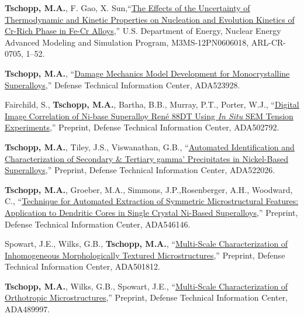 \begin{cvlist}
\item 
\textbf{Tschopp, M.A.}, F. Gao, X. Sun,``\href{https://apps.dtic.mil/dtic/tr/fulltext/u2/1043117.pdf}{The Effects of the Uncertainty of Thermodynamic and Kinetic Properties on Nucleation and Evolution Kinetics of Cr-Rich Phase in Fe-Cr Alloys},'' U.S. Department of Energy, Nuclear Energy Advanced Modeling and Simulation Program, M3MS-12PN0606018, ARL-CR-0705, 1--52.

\item 
\textbf{Tschopp, M.A.}, ``\href{http://www.dtic.mil/docs/citations/ADA523928}{Damage Mechanics Model Development for Monocrystalline Superalloys},'' Defense Technical Information Center, ADA523928.

\item 
Fairchild, S., \textbf{Tschopp, M.A.}, Bartha, B.B., Murray, P.T., Porter, W.J., ``\href{http://www.dtic.mil/docs/citations/ADA502792}{Digital Image Correlation of Ni-base Superalloy Ren\'{e} 88DT Using \textit{In Situ} SEM Tension Experiments},'' Preprint, Defense Technical Information Center, ADA502792.

\item 
\textbf{Tschopp, M.A.}, Tiley, J.S., Viswanathan, G.B., ``\href{http://www.dtic.mil/docs/citations/ADA522026}{Automated Identification and Characterization of Secondary \& Tertiary gamma' Precipitates in Nickel-Based Superalloys},'' Preprint, Defense Technical Information Center, ADA522026.

\item
\textbf{Tschopp, M.A.}, Groeber, M.A., Simmons, J.P.,Rosenberger, A.H., Woodward, C., ``\href{http://www.dtic.mil/docs/citations/ADA546146}{Technique for Automated Extraction of Symmetric Microstructural Features: Application to Dendritic Cores in Single Crystal Ni-Based Superalloys},'' Preprint, Defense Technical Information Center, ADA546146.

\item 
Spowart, J.E., Wilks, G.B., \textbf{Tschopp, M.A.}, ``\href{http://www.dtic.mil/docs/citations/ADA501812}{Multi-Scale Characterization of Inhomogeneous Morphologically Textured Microstructures},'' Preprint, Defense Technical Information Center, ADA501812. 

\item 
\textbf{Tschopp, M.A.}, Wilks, G.B., Spowart, J.E., ``\href{http://www.dtic.mil/docs/citations/ADA489997}{Multi-Scale Characterization of Orthotropic Microstructures},'' Preprint, Defense Technical Information Center, ADA489997. 


\end{cvlist}
